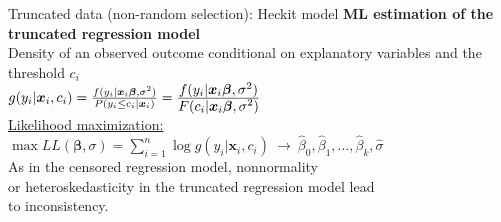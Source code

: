 \documentclass[usenames,dvipsnames]{beamer}
\newcommand{\mytikzmark}[2]{%
  \tikz[remember picture,inner sep=0pt,outer sep=0pt,baseline,anchor=base] 
    \node (#1) {\ensuremath{#2}};}
\begin{document}
\begin{frame}{Truncated data (non-random selection): Heckit model}
\textbf{ML estimation of the truncated regression model} \\
\bigskip
Density of an observed outcome conditional on explanatory variables and the threshold $c_i$ \\
\bigskip
$g(y_i|\bm{x}_i, c_i) = \frac{f(y_i|\bm{x}_i \bm{\beta}, \sigma^2)}{P(y_i \le c_i|\bm{x}_i)} = \frac{\mytikzmark{1}{f(y_i|\bm{x}_i \bm{\beta}, \sigma^2)}}{\mytikzmark{2}{F(c_i|\bm{x}_i \bm{\beta}, \sigma^2)}}$ \\
\bigskip
\underline{Likelihood maximization:} \\
\bigskip
$\max LL(\bm{\beta}, \sigma) = \sum \limits_{i=1}^{n} \log g(y_i|\bm{x}_i, c_i) \ \to \ \hat{\beta}_0, \hat{\beta}_1, \dots, \hat{\beta}_k, \hat{\sigma}$ \\
\bigskip
As in the censored regression model, nonnormality \\or heteroskedasticity in the truncated regression model lead \\to inconsistency. 
\end{frame}
\end{document}
